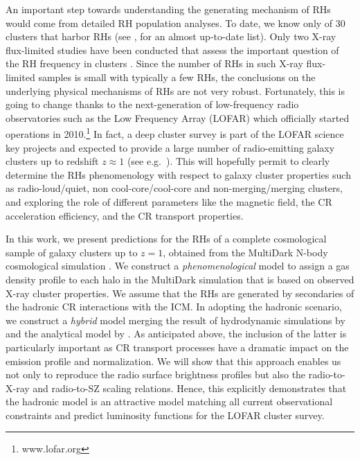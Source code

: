 \documentclass[traditabstract]{aa}
\begin{document}
An important step towards understanding the generating mechanism of RHs would
come from detailed RH population analyses. To date, we know only of 30 clusters
that harbor RHs (see \citealp{2011A&A...527A..99E}, for an almost up-to-date
list). Only two X-ray flux-limited studies have been conducted that assess the
important question of the RH frequency in clusters \citep{1999NewA....4..141G,
  VenturiGMRT_2}. Since the number of RHs in such X-ray flux-limited samples is
small with typically a few RHs, the conclusions on the underlying physical
mechanisms of RHs are not very robust. Fortunately, this is going to change
thanks to the next-generation of low-frequency radio observatories such as the
Low Frequency Array (LOFAR) which officially started operations in
2010.\footnote{www.lofar.org} In fact, a deep cluster survey is part of the
LOFAR science key projects and expected to provide a large number of
radio-emitting galaxy clusters up to redshift $z\approx1$ (see
e.g.~\citealp{2010A&A...509A..68C,2012JApA..tmp...34R}).  This will hopefully
permit to clearly determine the RHs phenomenology with respect to galaxy cluster
properties such as radio-loud/quiet, non cool-core/cool-core and
non-merging/merging clusters, and exploring the role of different parameters
like the magnetic field, the CR acceleration efficiency, and the CR transport
properties.

In this work, we present predictions for the RHs of a complete cosmological
sample of galaxy clusters up to $z= 1$, obtained from the MultiDark N-body
cosmological simulation \citep{2011arXiv1104.5130P}. We construct a
\emph{phenomenological} model to assign a gas density profile to each halo in
the MultiDark simulation that is based on observed X-ray cluster properties. We
assume that the RHs are generated by secondaries of the hadronic CR interactions
with the ICM. In adopting the hadronic scenario, we construct a \emph{hybrid}
model merging the result of hydrodynamic simulations by
\cite{2010MNRAS.409..449P} and the analytical model by
\cite{2011A&A...527A..99E}.  As anticipated above, the inclusion of the latter
is particularly important as CR transport processes have a dramatic impact on
the emission profile and normalization. We will show that this approach enables
us not only to reproduce the radio surface brightness profiles but also the
radio-to-X-ray and radio-to-SZ scaling relations. Hence, this explicitly
demonstrates that the hadronic model is an attractive model matching all current
observational constraints and predict luminosity functions for the LOFAR cluster
survey.
\end{document}
